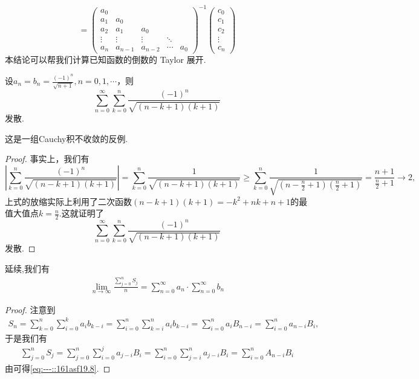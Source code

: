 \documentclass[../../main.tex]{subfiles}
\begin{document}
\begin{conclusion}
\[=
\begin{pmatrix}
a_0 \\
a_1 & a_0 \\
a_2 & a_1 & a_0 \\
\vdots & \vdots & \vdots & \ddots \\
a_n & a_{n-1} & a_{n-2} & \cdots & a_0
\end{pmatrix}^{-1}
\begin{pmatrix}
c_0 \\
c_1 \\
c_2 \\
\vdots \\
c_n
\end{pmatrix}
\]
本结论可以帮我们计算已知函数的倒数的 Taylor 展开.
\end{conclusion}


\begin{example}
设\(a_n = b_n = \frac{(-1)^n}{\sqrt{n + 1}}, n = 0,1,\cdots\)，则
\[
\sum_{n = 0}^{\infty} \sum_{k = 0}^{n} \frac{(-1)^n}{\sqrt{(n - k + 1)(k + 1)}}
\]
发散.
\end{example}
\begin{remark}
这是一组Cauchy积不收敛的反例.
\end{remark}
\begin{proof}
事实上，我们有
\[
\left| \sum_{k = 0}^{n} \frac{(-1)^n}{\sqrt{(n - k + 1)(k + 1)}} \right| = \sum_{k = 0}^{n} \frac{1}{\sqrt{(n - k + 1)(k + 1)}} \geqslant \sum_{k = 0}^{n} \frac{1}{\sqrt{\left(n - \frac{n}{2} + 1\right)\left(\frac{n}{2} + 1\right)}} = \frac{n + 1}{\frac{n}{2} + 1} \to 2,
\]
上式的放缩实际上利用了二次函数$\left( n-k+1 \right) \left( k+1 \right) =-k^2+nk+n+1$的最值大值点$k=\frac{n}{2}$.这就证明了
\[
\sum_{n = 0}^{\infty} \sum_{k = 0}^{n} \frac{(-1)^n}{\sqrt{(n - k + 1)(k + 1)}}
\]
发散.
\end{proof}

\begin{proposition}\label{proposition:命题3....4}
延续,我们有
\begin{align}
\lim\limits_{n\to\infty} \frac{\sum\limits_{j=0}^{n} S_j}{n} = \sum\limits_{n=0}^{\infty} a_n \cdot \sum\limits_{n=0}^{\infty} b_n
\label{eq:---::161asf19.8}
\end{align}
\end{proposition}
\begin{proof}
注意到
\begin{align*}
S_n = \sum\limits_{k=0}^{n} \sum\limits_{i=0}^{k} a_i b_{k-i} = \sum\limits_{i=0}^{n} \sum\limits_{k=i}^{n} a_i b_{k-i} = \sum\limits_{i=0}^{n} a_i B_{n-i} = \sum\limits_{i=0}^{n} a_{n-i} B_i,
\end{align*}
于是我们有
\begin{align*}
\sum\limits_{j=0}^{n} S_j = \sum\limits_{j=0}^{n} \sum\limits_{i=0}^{j} a_{j-i} B_i = \sum\limits_{i=0}^{n} \sum\limits_{j=i}^{n} a_{j-i} B_i = \sum\limits_{i=0}^{n} A_{n-i} B_i
\end{align*}
由可得\eqref{eq:---::161asf19.8}.
\end{proof}
\end{document}
